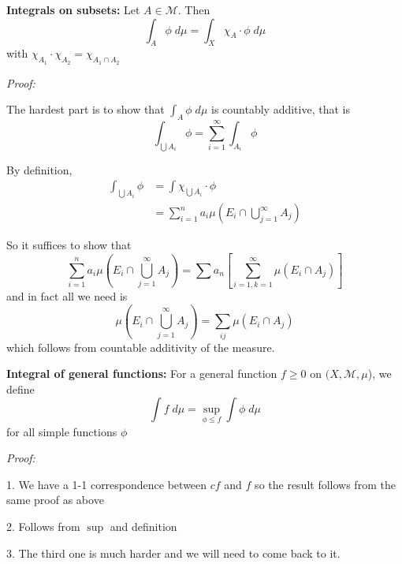 \documentclass[12pt]{report}
\newcommand{\M}{\mathcal{M}}
\newcommand{\X}{\chi}
\newenvironment*{tbox}[2][gray]{
    \begin{tcolorbox}[
        parbox=false,
        colback=#1!5!white,
        colframe=#1!75!black,
        breakable,
        title={#2}
    ]}
    {\end{tcolorbox}}
\begin{document}
    \textbf{Integrals on subsets:} Let $A \in \M$. Then 
    \[\int_A \phi \; d\mu = \int_X \X_A \cdot \phi \; d\mu\]
    with $\X_{A_1} \cdot \X_{A_2} = \X_{A_1 \cap A_2}$

    \begin{tbox}{\textbf{Proposition:} For $A \in \M$, the mapping $A \to \int_A \phi\; d\mu$ is a measure on $\M$}
        \emph{Proof:} 

        The hardest part is to show that $\int_A \phi\; d\mu$ is countably additive, that is 
        \[\int_{\bigcup A_i} \phi = \sum_{i=1}^\infty \int_{A_i} \phi\] 

        By definition, 
        \begin{align*}
            \int_{\bigcup A_i} \phi &= \int \X_{\bigcup A_i} \cdot \phi\\
            &= \sum_{i=1}^n a_i \mu(E_i \cap \bigcup_{j=1}^\infty A_j)
        \end{align*}

        So it suffices to show that 
        \[\sum_{i=1}^n a_i \mu(E_i \cap \bigcup_{j=1}^\infty A_j) = \sum a_n \left[\sum_{i = 1, k = 1}^{\infty} \mu(E_i \cap A_j)\right]\] 
        and in fact all we need is 
        \[\mu(E_i \cap \bigcup_{j=1}^\infty A_j) = \sum_{ij} \mu(E_i \cap A_j)\]
        which follows from countable additivity of the measure.
    \end{tbox}

    \textbf{Integral of general functions:} For a general function $f \geq 0$ on $(X, \M, \mu$), we define 
    \[\int f\; d\mu = \sup_{\phi\leq f} \int \phi \; d\mu\]
    for all simple functions $\phi$

    \begin{tbox}{\textbf{Properties:} For $f \geq 0$, we have the following properties:
        \begin{enumerate}
            \item $c \int f \; d\mu = \int cf \; d\mu$
            \item If $f \leq g$, then $\int f \; d\mu \leq \int g \; d\mu$
            \item $\int f + g \; d\mu = \int f \; d\mu + \int g \; d\mu$
        \end{enumerate}}
        \emph{Proof:} 

        1. We have a 1-1 correspondence between $cf$ and $f$ so the result follows from the same proof as above 

        2. Follows from $\sup$ and definition

        3. The third one is much harder and we will need to come back to it. 
    \end{tbox}
    
\end{document}
